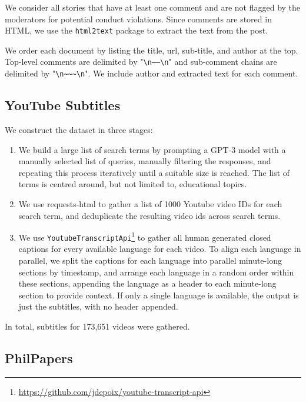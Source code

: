 \documentclass[11pt,a4paper]{article}
\begin{document}
\begin{appendices}
We consider all stories that have at least one comment and are not flagged by the moderators for potential conduct violations. Since comments are stored in HTML, we use the {\tt html2text} package to extract the text from the post.

We order each document by listing the title, url, sub-title, and author at the top. Top-level comments are delimited by "\texttt{\textbackslash n------\textbackslash n}" and sub-comment chains are delimited by "\texttt{\textbackslash n\textasciitilde{}\textasciitilde{}\textasciitilde{}\textbackslash n}". We include author and extracted text for each comment.

\subsection{YouTube Subtitles}

We construct the dataset in three stages:

\begin{enumerate}  
\item We build a large list of search terms by prompting a GPT-3 model with a manually selected list of queries, manually filtering the responses, and repeating this process iteratively until a suitable size is reached. The list of terms is centred around, but not limited to, educational topics.
\item We use requests-html to gather a list of 1000 Youtube video IDs for each search term, and deduplicate the resulting video ids across search terms.
\item We use \texttt{YoutubeTranscriptApi}\footnote{ \url{https://github.com/jdepoix/youtube-transcript-api}} to gather all human generated closed captions for every available language for each video. To align each language in parallel, we split the captions for each language into parallel minute-long sections by timestamp, and arrange each language in a random order within these sections, appending the language as a header to each minute-long section to provide context. If only a single language is available, the output is just the subtitles, with no header appended.
\end{enumerate}

In total, subtitles for 173,651 videos were gathered.

\subsection{PhilPapers}


\end{appendices}
\end{document}
